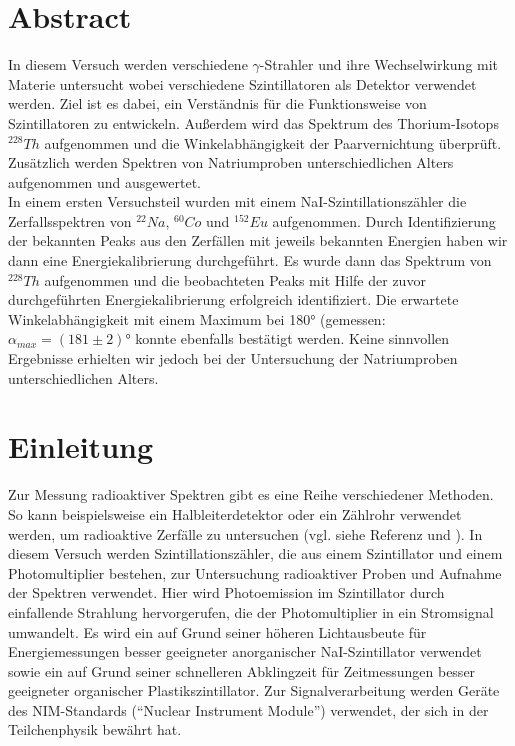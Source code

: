 \documentclass[12pt,listof=totoc]{scrartcl}
\title{\vspace{0cm}{\Huge Fortgeschrittenen-Praktikum I:\\ \vspace{1cm} Szintillationszähler}}
\author{Saskia Bondza\\Simon Stephan}
\date{durchgeführt am 12.10.2016 und 13.10.2016}
\begin{document}
\maketitle
\newpage

\section*{Abstract}

In diesem Versuch werden verschiedene $\gamma$-Strahler und ihre Wechselwirkung mit Materie untersucht wobei verschiedene Szintillatoren als Detektor verwendet werden. Ziel ist es dabei, ein Verständnis für die Funktionsweise von Szintillatoren zu entwickeln. Außerdem wird das Spektrum des Thorium-Isotops $^{228}Th$ aufgenommen  und die Winkelabhängigkeit der Paarvernichtung überprüft. Zusätzlich werden Spektren von Natriumproben unterschiedlichen Alters aufgenommen und ausgewertet.\\

In einem ersten Versuchsteil wurden mit einem NaI-Szintillationszähler die Zerfallsspektren von  $^{22}Na$, $^{60}Co$ und $^{152}Eu$ aufgenommen. Durch Identifizierung der bekannten Peaks aus den Zerfällen mit jeweils bekannten Energien haben wir dann eine Energiekalibrierung durchgeführt. Es wurde dann das Spektrum von $^{228}Th$ aufgenommen und die beobachteten Peaks mit Hilfe der zuvor durchgeführten Energiekalibrierung erfolgreich identifiziert. 
Die erwartete Winkelabhängigkeit mit einem Maximum bei 180° (gemessen: $\alpha_{max} = (181\pm 2)°$ konnte ebenfalls bestätigt werden.
Keine sinnvollen Ergebnisse erhielten wir jedoch bei der Untersuchung der Natriumproben unterschiedlichen Alters.

\newpage

\thispagestyle{empty}
\tableofcontents
\newpage

\section{Einleitung}


Zur Messung radioaktiver Spektren gibt es eine Reihe verschiedener Methoden. So kann beispielsweise ein Halbleiterdetektor oder ein Zählrohr verwendet werden, um radioaktive Zerfälle zu untersuchen (vgl. siehe Referenz \cite{staat} und \cite{staat}). In diesem Versuch werden Szintillationszähler, die aus einem Szintillator und einem Photomultiplier bestehen, zur Untersuchung radioaktiver Proben und Aufnahme der Spektren verwendet. Hier wird Photoemission im Szintillator durch einfallende Strahlung hervorgerufen, die der Photomultiplier in ein Stromsignal umwandelt.
Es wird ein auf Grund seiner höheren Lichtausbeute für Energiemessungen besser geeigneter anorganischer NaI-Szintillator verwendet sowie ein auf Grund seiner schnelleren Abklingzeit für Zeitmessungen besser geeigneter organischer Plastikszintillator.
Zur Signalverarbeitung werden Geräte des NIM-Standards ("`Nuclear Instrument Module"') verwendet, der sich in der Teilchenphysik bewährt hat.\\
\end{document}
